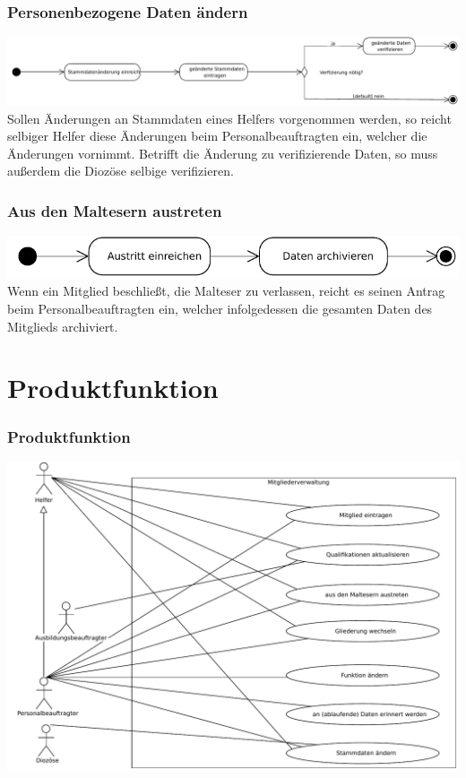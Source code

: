 \documentclass{beamer}
\begin{document}
\begin{frame}
\frametitle{Personenbezogene Daten ändern}
\includegraphics[width=\textwidth]{PDF/BusinessP/Daten_aendern.pdf}
\pause
Sollen Änderungen an Stammdaten eines Helfers vorgenommen werden, so reicht selbiger Helfer diese Änderungen beim Personalbeauftragten ein, welcher die Änderungen vornimmt. Betrifft die Änderung zu verifizierende Daten, so muss außerdem die Diozöse selbige verifizieren.
\end{frame}


\begin{frame}
\frametitle{Aus den Maltesern austreten}
\includegraphics[width=\textwidth]{PDF/BusinessP/Austreten.pdf}
\pause
Wenn ein Mitglied beschließt, die Malteser zu verlassen, reicht es seinen Antrag beim Personalbeauftragten ein, welcher infolgedessen die gesamten Daten des Mitglieds archiviert.
\end{frame}


\section{Produktfunktion}		
\begin{frame}
\frametitle{Produktfunktion}
\includegraphics[height=0.75 \textheight]{PDF/Use_Case_Diagram/Use_Case.pdf}
\end{frame}
\end{document}
